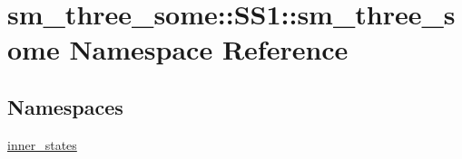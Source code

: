 \hypertarget{namespacesm__three__some_1_1SS1_1_1sm__three__some}{}\section{sm\+\_\+three\+\_\+some\+:\+:S\+S1\+:\+:sm\+\_\+three\+\_\+some Namespace Reference}
\label{namespacesm__three__some_1_1SS1_1_1sm__three__some}
\subsection*{Namespaces}
\begin{DoxyCompactItemize}
\item 
 \hyperlink{namespacesm__three__some_1_1SS1_1_1sm__three__some_1_1inner__states}{inner\+\_\+states}
\end{DoxyCompactItemize}
